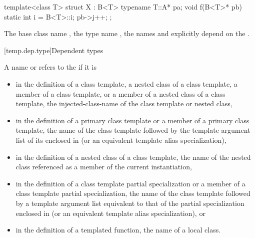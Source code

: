 \pnum
\begin{example}
\begin{codeblock}
template<class T> struct X : B<T> {
  typename T::A* pa;
  void f(B<T>* pb) {
    static int i = B<T>::i;
    pb->j++;
  }
};
\end{codeblock}

The base class name
,
the type name
,
the names
and
explicitly depend on the
.
\end{example}

[temp.dep.type]{Dependent types}

\pnum
A name or  refers to the
if it is
\begin{itemize}
\item
in the definition of a class template, a nested class of a class template,
a member of a class template, or a member of a nested class of a class template,
the injected-class-name of the class template or nested class,
\item
in the definition of a primary class template
or a member of a primary class template, the name of the
class template followed by the template argument list of
its  enclosed in
\tcode{<>} (or an equivalent template alias specialization),
\item
in the definition of a nested class of a class template,
the name of the nested class referenced as a member of the
current instantiation,
\item
in the definition of a class template partial specialization
or a member of a class template partial specialization, the name of
the class template followed by a template argument list
equivalent to that of the partial specialization
enclosed in \tcode{<>} (or an equivalent template alias specialization), or
\item
in the definition of a templated function,
the name of a local class.
\end{itemize}

